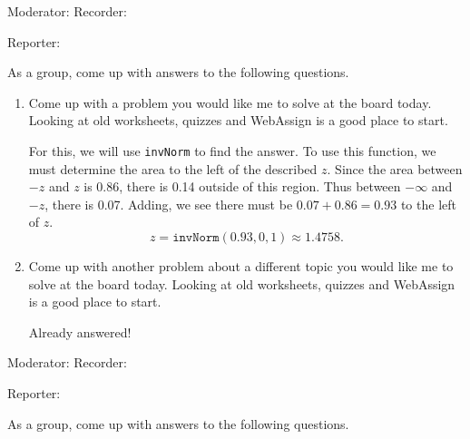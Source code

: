 \documentclass{article}
\newcommand{\answer}[1]{\color{red}#1}
\begin{document}
{{{

\begin{center}
\textbf{}
\end{center}

Moderator:{\underbar{\hspace{2in}}} \hfill  Recorder:{\underbar{\hspace{2in}}}

\bigskip

Reporter:{\underbar{\hspace{2in}}}

As a group, come up with answers to the following questions.

\begin{enumerate} 

\item Come up with a problem you would like me to solve at the board today. Looking at old worksheets, quizzes and WebAssign is a good place to start.

{\answer For this, we will use \texttt{invNorm} to find the answer. To use this function, we must determine the area to the left of the described $z$. Since the area between $-z$ and $z$ is 0.86, there is 0.14 outside of this region. Thus between $-\infty$ and $-z$, there is 0.07. Adding, we see there must be $0.07 + 0.86 = 0.93$ to the left of $z$.
$$z = \texttt{invNorm}(0.93,0,1) \approx 1.4758.$$ }

\item Come up with another problem about a different topic you would like me to solve at the board today. Looking at old worksheets, quizzes and WebAssign is a good place to start. 

{\answer Already answered!}
\end{enumerate}



\begin{center}
\textbf{}
\end{center}

Moderator:{\underbar{\hspace{2in}}} \hfill  Recorder:{\underbar{\hspace{2in}}}

\bigskip

Reporter:{\underbar{\hspace{2in}}}

As a group, come up with answers to the following questions.

}}}
\end{document}
